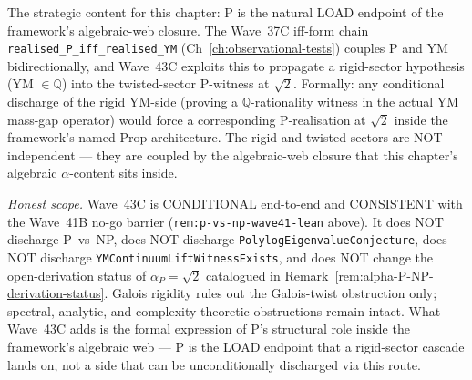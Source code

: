 \begin{remark}
The strategic content for this chapter: P is the natural LOAD endpoint of the framework's algebraic-web closure. The Wave~37C iff-form chain \texttt{realised\_P\_iff\_realised\_YM} (Ch~\ref{ch:observational-tests}) couples P and YM bidirectionally, and Wave~43C exploits this to propagate a rigid-sector hypothesis (YM $\in \mathbb{Q}$) into the twisted-sector P-witness at $\sqrt{2}$. Formally: any conditional discharge of the rigid YM-side (proving a $\mathbb{Q}$-rationality witness in the actual YM mass-gap operator) would force a corresponding P-realisation at $\sqrt{2}$ inside the framework's named-Prop architecture. The rigid and twisted sectors are NOT independent --- they are coupled by the algebraic-web closure that this chapter's algebraic $\alpha$-content sits inside.

\emph{Honest scope.} Wave~43C is CONDITIONAL end-to-end and CONSISTENT with the Wave~41B no-go barrier (\texttt{rem:p-vs-np-wave41-lean} above). It does NOT discharge P~vs~NP, does NOT discharge \texttt{PolylogEigenvalueConjecture}, does NOT discharge \texttt{YMContinuumLiftWitnessExists}, and does NOT change the open-derivation status of $\alpha_P = \sqrt{2}$ catalogued in Remark~\ref{rem:alpha-P-NP-derivation-status}. Galois rigidity rules out the Galois-twist obstruction only; spectral, analytic, and complexity-theoretic obstructions remain intact. What Wave~43C adds is the formal expression of P's structural role inside the framework's algebraic web --- P is the LOAD endpoint that a rigid-sector cascade lands on, not a side that can be unconditionally discharged via this route.
\end{remark}

